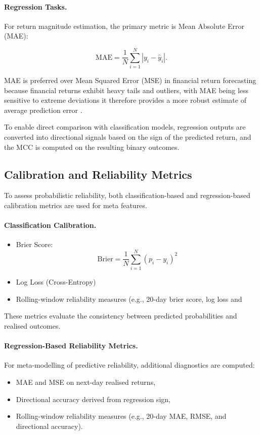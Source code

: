 \documentclass{l4proj}
\begin{document}
\paragraph{Regression Tasks.}
For return magnitude estimation, the primary metric is Mean Absolute Error (MAE):

\[
\mathrm{MAE} = \frac{1}{N} \sum_{i=1}^{N} |y_i - \hat{y}_i|.
\]

MAE is preferred over Mean Squared Error (MSE) in financial return forecasting because financial returns exhibit heavy tails and outliers, with MAE being less sensitive to extreme deviations it therefore provides a more robust estimate of average prediction error \citep{2017EGUGA..19.3574B}.

To enable direct comparison with classification models, regression outputs are converted into directional signals based on the sign of the predicted return, and the MCC is computed on the resulting binary outcomes.

\subsection{Calibration and Reliability Metrics}

To assess probabilistic reliability, both classification-based and regression-based calibration metrics are used for meta features.

\paragraph{Classification Calibration.}
\begin{itemize}
    \item Brier Score:
    \[
    \mathrm{Brier} = \frac{1}{N} \sum_{i=1}^{N} (p_i - y_i)^2
    \]
    \item Log Loss (Cross-Entropy)
    \item Rolling-window reliability measures (e.g., 20-day brier score, log loss and 
\end{itemize}

These metrics evaluate the consistency between predicted probabilities and realised outcomes.

\paragraph{Regression-Based Reliability Metrics.}
For meta-modelling of predictive reliability, additional diagnostics are computed:

\begin{itemize}
    \item MAE and MSE on next-day realised returns,
    \item Directional accuracy derived from regression sign,
    \item Rolling-window reliability measures (e.g., 20-day MAE, RMSE, and directional accuracy).
\end{itemize}
\end{document}
